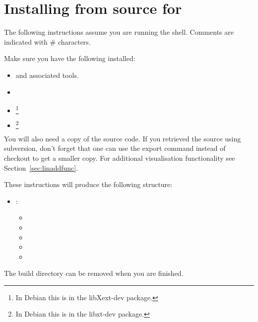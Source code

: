 
%
%
%

\section{Installing from source for \linux}
\label{sec:srclinux}
The following instructions assume you are running the  shell.
Comments are indicated with \# characters.

Make sure you have the following installed:
\begin{itemize}
 \item {} and associated tools.
\item {}
\item {}\footnote{In Debian this is in the libXext-dev package.}
\item {}\footnote{In Debian this is in the libxt-dev package.}
\end{itemize}

You will also need a copy of the \esfinley source code.
If you retrieved the source using subversion, don't forget that one can use the export command instead of checkout to get a smaller copy.
For additional visualisation functionality see Section~\ref{sec:linaddfunc}.

These instructions will produce the following structure:
\begin{itemize}
\item {}: \begin{itemize}
 \item {}
\item {}
\item {}
\item {}
\item {}
  \end{itemize}
\end{itemize}

The build directory can be removed when you are finished.


